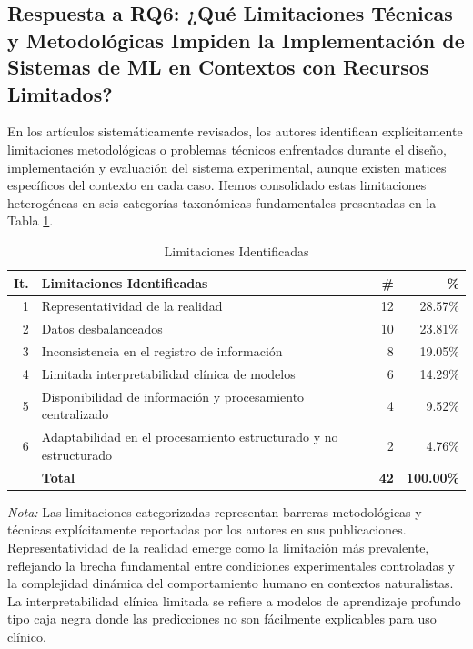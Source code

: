 \documentclass{ieeeaccess}
\begin{document}
	\subsection{Respuesta a RQ6: ¿Qué Limitaciones Técnicas y Metodológicas Impiden la Implementación de Sistemas de ML en Contextos con Recursos Limitados?}
	
	En los artículos sistemáticamente revisados, los autores identifican explícitamente limitaciones metodológicas o problemas técnicos enfrentados durante el diseño, implementación y evaluación del sistema experimental, aunque existen matices específicos del contexto en cada caso. Hemos consolidado estas limitaciones heterogéneas en seis categorías taxonómicas fundamentales presentadas en la Tabla \ref{tab:limitaciones}.
	
	\begin{table}[htbp]
		\caption{Limitaciones Identificadas}
		\label{tab:limitaciones}
		\centering
		\begin{tabular}{|r|p{120pt}|r|r|}
			\hline
			\textbf{It.} & \textbf{Limitaciones Identificadas} & \textbf{\#} & \textbf{\%} \\
			\hline
			1 & Representatividad de la realidad & 12 & 28.57\% \\
			2 & Datos desbalanceados & 10 & 23.81\% \\
			3 & Inconsistencia en el registro de información & 8 & 19.05\% \\
			4 & Limitada interpretabilidad clínica de modelos & 6 & 14.29\% \\
			5 & Disponibilidad de información y procesamiento centralizado & 4 & 9.52\% \\
			6 & Adaptabilidad en el procesamiento estructurado y no estructurado & 2 & 4.76\% \\
			\hline
			& \textbf{Total} & \textbf{42} & \textbf{100.00\%} \\
			\hline
		\end{tabular}
		\begin{flushleft}
			\small \textit{Nota:} Las limitaciones categorizadas representan barreras metodológicas y técnicas explícitamente reportadas por los autores en sus publicaciones. Representatividad de la realidad emerge como la limitación más prevalente, reflejando la brecha fundamental entre condiciones experimentales controladas y la complejidad dinámica del comportamiento humano en contextos naturalistas. La interpretabilidad clínica limitada se refiere a modelos de aprendizaje profundo tipo caja negra donde las predicciones no son fácilmente explicables para uso clínico.
		\end{flushleft}
	\end{table}
	
\end{document}
